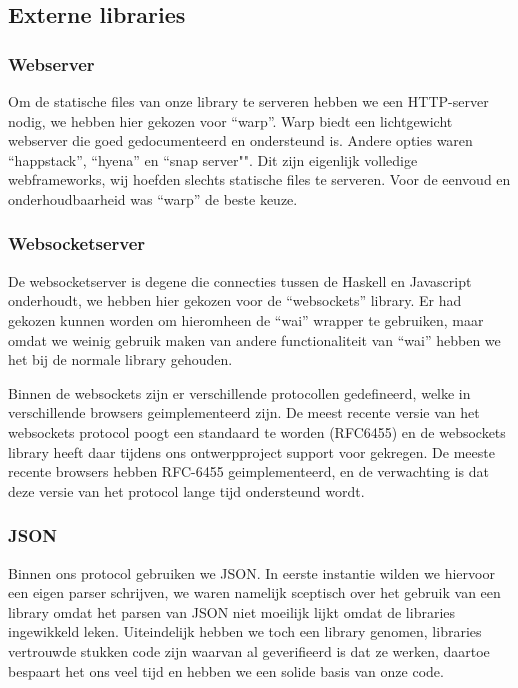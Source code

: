 \subsection{Externe libraries}

\subsubsection{Webserver}
Om de statische files van onze library te serveren hebben we een HTTP-server nodig, we hebben hier gekozen voor ``warp''. Warp biedt een lichtgewicht webserver die goed gedocumenteerd en ondersteund is. Andere opties waren ``happstack'', ``hyena'' en ``snap server"". Dit zijn eigenlijk volledige webframeworks, wij hoefden slechts statische files te serveren. Voor de eenvoud en onderhoudbaarheid was ``warp'' de beste keuze.

\subsubsection{Websocketserver}
De websocketserver is degene die connecties tussen de Haskell en Javascript onderhoudt, we hebben hier gekozen voor de ``websockets'' library. Er had gekozen kunnen worden om hieromheen de ``wai'' wrapper te gebruiken, maar omdat we weinig gebruik maken van andere functionaliteit van ``wai'' hebben we het bij de normale library gehouden.

Binnen de websockets zijn er verschillende protocollen gedefineerd, welke in verschillende browsers geimplementeerd zijn. De meest recente versie van het websockets protocol poogt een standaard te worden (RFC6455) en de websockets library heeft daar tijdens ons ontwerpproject support voor gekregen. De meeste recente browsers hebben RFC-6455 geimplementeerd, en de verwachting is dat deze versie van het protocol lange tijd ondersteund wordt.

\subsubsection{JSON}
Binnen ons protocol gebruiken we JSON. In eerste instantie wilden we hiervoor een eigen parser schrijven, we waren namelijk sceptisch over het gebruik van een library omdat het parsen van JSON niet moeilijk lijkt omdat de libraries ingewikkeld leken. Uiteindelijk hebben we toch een library genomen, libraries vertrouwde stukken code zijn waarvan al geverifieerd is dat ze werken, daartoe bespaart het ons veel tijd en hebben we een solide basis van onze code.

